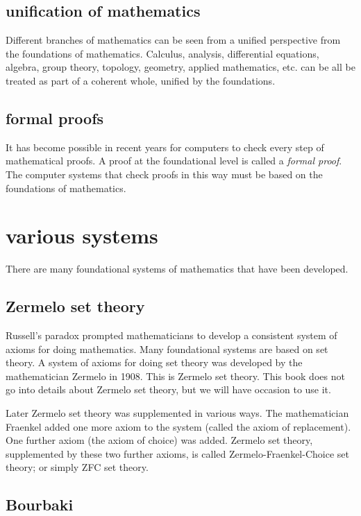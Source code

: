 \subsection{unification of mathematics}

Different branches of mathematics can be seen from a unified perspective from the foundations of mathematics.  Calculus, analysis, differential equations, algebra, group theory, topology, geometry, applied mathematics, etc. can be all be treated as part of a coherent whole, unified by the foundations.

\subsection{formal proofs}

It has become possible in recent years for computers to check every step of mathematical proofs.  A proof at the foundational level is called a {\it formal proof}.  The computer systems that check proofs in this way must be based on the foundations of mathematics.

\section{various systems}

There are many foundational systems of mathematics that have been developed.

\subsection{Zermelo set theory}

Russell's paradox prompted mathematicians to develop a consistent system of axioms for doing mathematics.  Many foundational systems are based on set theory.  A system of axioms for doing set theory was developed by the mathematician Zermelo in 1908.   This is Zermelo set theory.  This book does not go into details about Zermelo set theory, but we will have occasion to use it.  

Later Zermelo set theory was supplemented in various ways.  The mathematician Fraenkel added one more axiom to the system (called the axiom of replacement).  One further axiom (the axiom of choice) was added.  Zermelo set theory, supplemented by these two further axioms, is called Zermelo-Fraenkel-Choice set theory; or simply ZFC set theory.

\subsection{Bourbaki}

